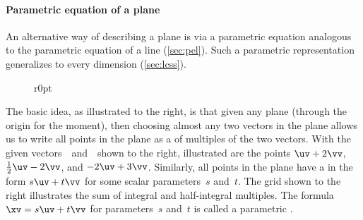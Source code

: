 



\paragraph{Parametric equation of a plane}
An alternative way of describing a plane is via a parametric equation analogous to the parametric equation of a line (\cref{sec:pel}).
Such a parametric representation generalizes to every dimension (\cref{sec:lcss}).

\begin{wrapfigure}r{0pt}
\end{wrapfigure}
The basic idea, as illustrated to the right, is that given any plane (through the origin for the moment), then choosing almost any two vectors in the plane allows us to write all points in the plane as a  of multiples of the two vectors.
With the given vectors~\uv\ and~\vv\ shown to the right, illustrated are the points \(\uv+2\vv\), \(\tfrac12\uv-2\vv\), and \(-2\uv+3\vv\).
Similarly, all points in the plane have a  in the form \(s\uv+t\vv\) for some scalar parameters~\(s\) and~\(t\).
The grid shown to the right illustrates the sum of integral and half-integral multiples.
The formula \(\xv=s\uv+t\vv\) for parameters~\(s\) and~\(t\) is called a parametric .



